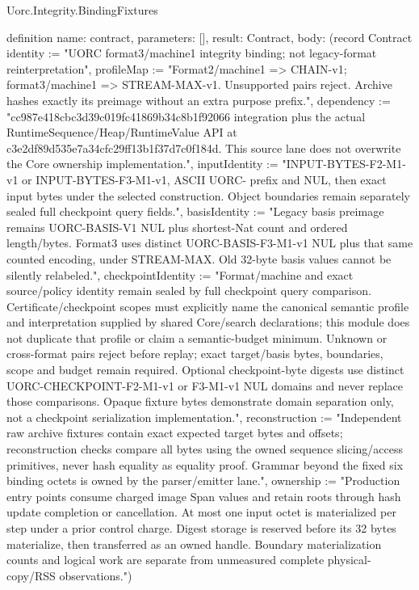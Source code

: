 \begin{lexlean}{Uorc.Integrity.BindingFixtures}
\begin{semanticmodule}
definition{
  name: contract,
  parameters: [],
  result: Contract,
  body: (record Contract {identity := "UORC format3/machine1 integrity binding; not legacy-format reinterpretation", profileMap := "Format2/machine1 => CHAIN-v1; format3/machine1 => STREAM-MAX-v1. Unsupported pairs reject. Archive hashes exactly its preimage without an extra purpose prefix.", dependency := "cc987e418cbc3d39c019fc41869b34c8b1f92066 integration plus the actual RuntimeSequence/Heap/RuntimeValue API at c3e2df89d535e7a34cfc29ff13b1f37d7c0f184d. This source lane does not overwrite the Core ownership implementation.", inputIdentity := "INPUT-BYTES-F2-M1-v1 or INPUT-BYTES-F3-M1-v1, ASCII UORC- prefix and NUL, then exact input bytes under the selected construction. Object boundaries remain separately sealed full checkpoint query fields.", basisIdentity := "Legacy basis preimage remains UORC-BASIS-V1 NUL plus shortest-Nat count and ordered length/bytes. Format3 uses distinct UORC-BASIS-F3-M1-v1 NUL plus that same counted encoding, under STREAM-MAX. Old 32-byte basis values cannot be silently relabeled.", checkpointIdentity := "Format/machine and exact source/policy identity remain sealed by full checkpoint query comparison. Certificate/checkpoint scopes must explicitly name the canonical semantic profile and interpretation supplied by shared Core/search declarations; this module does not duplicate that profile or claim a semantic-budget minimum. Unknown or cross-format pairs reject before replay; exact target/basis bytes, boundaries, scope and budget remain required. Optional checkpoint-byte digests use distinct UORC-CHECKPOINT-F2-M1-v1 or F3-M1-v1 NUL domains and never replace those comparisons. Opaque fixture bytes demonstrate domain separation only, not a checkpoint serialization implementation.", reconstruction := "Independent raw archive fixtures contain exact expected target bytes and offsets; reconstruction checks compare all bytes using the owned sequence slicing/access primitives, never hash equality as equality proof. Grammar beyond the fixed six binding octets is owned by the parser/emitter lane.", ownership := "Production entry points consume charged image Span values and retain roots through hash update completion or cancellation. At most one input octet is materialized per step under a prior control charge. Digest storage is reserved before its 32 bytes materialize, then transferred as an owned handle. Boundary materialization counts and logical work are separate from unmeasured complete physical-copy/RSS observations."})
}
\end{semanticmodule}
\end{lexlean}

